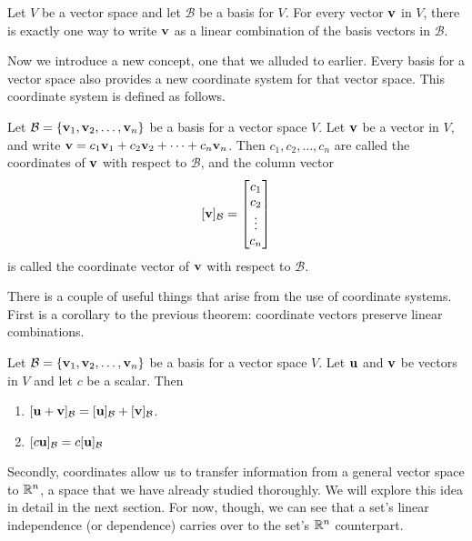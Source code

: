 \documentclass[../m73main.tex]{subfiles}
\begin{document}
\begin{theorem}
	Let $V$ be a vector space and let $\mathcal{B}$ be a basis for $V$.
	For every vector $\mathbf{v}$ in $V$, there is exactly one way to write $\mathbf{v}$ as a linear combination of the basis vectors in $\mathcal{B}$.
\end{theorem}

Now we introduce a new concept, one that we alluded to earlier.
Every basis for a vector space also provides a new coordinate system for that vector space.
This coordinate system is defined as follows.

\begin{definition}
	Let $\mathcal{B} = \{\mathbf{v}_1, \mathbf{v}_2, \ldots, \mathbf{v}_n\}$ be a basis for a vector space $V$.
	Let $\mathbf{v}$ be a vector in $V$, and write $\mathbf{v} = c_1 \mathbf{v}_1 + c_2 \mathbf{v}_2 + \cdots + c_n \mathbf{v}_n$.
	Then $c_1, c_2, \ldots, c_n$ are called the coordinates of $\mathbf{v}$ with respect to $\mathcal{B}$, and the column vector
	\[ [\mathbf{v}]_{\mathcal{B}} = \begin{bmatrix} c_1 \\ c_2 \\ \vdots \\ c_n \end{bmatrix} \]
	is called the coordinate vector of $\mathbf{v}$ with respect to $\mathcal{B}$.
\end{definition}

There is a couple of useful things that arise from the use of coordinate systems.
First is a corollary to the previous theorem: coordinate vectors preserve linear combinations.

\begin{theorem}
	Let $\mathcal{B} = \{\mathbf{v}_1, \mathbf{v}_2, \ldots, \mathbf{v}_n\}$ be a basis for a vector space $V$.
	Let $\mathbf{u}$ and $\mathbf{v}$ be vectors in $V$ and let $c$ be a scalar.
	Then
	\begin{enumerate}[label=(\alph*)]
		\item $[\mathbf{u} + \mathbf{v}]_{\mathcal{B}} = [\mathbf{u}]_{\mathcal{B}} + [\mathbf{v}]_{\mathcal{B}}$.
		\item $[c \mathbf{u}]_{\mathcal{B}} = c[\mathbf{u}]_{\mathcal{B}}$
	\end{enumerate}
\end{theorem}

Secondly, coordinates allow us to transfer information from a general vector space to $\mathbb{R}^n$, a space that we have already studied thoroughly.
We will explore this idea in detail in the next section.
For now, though, we can see that a set's linear independence (or dependence) carries over to the set's $\mathbb{R}^n$ counterpart.
\end{document}
